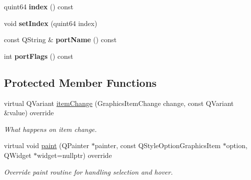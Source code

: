 \begin{Indent}
\begin{DoxyCompactItemize}
quint64 {\bfseries index} () const
\item 
\mbox{\label{classrev_1_1_view_1_1_node_view_port_a674d00e58a7e34e0f0c96810f3c87cbf}} 
void {\bfseries set\+Index} (quint64 index)
\item 
\mbox{\label{classrev_1_1_view_1_1_node_view_port_a384383ce50c4818f1f81d1b0626b55d6}} 
const Q\+String \& {\bfseries port\+Name} () const
\item 
\mbox{\label{classrev_1_1_view_1_1_node_view_port_a3968ec7da920e13cf15bbaa63ad87dab}} 
int {\bfseries port\+Flags} () const
\end{DoxyCompactItemize}
\end{Indent}
\subsection*{Protected Member Functions}
\begin{DoxyCompactItemize}
\item 
\mbox{\label{classrev_1_1_view_1_1_node_view_port_a2294c07c146aff6356b6f4ee5c8f62a6}} 
virtual Q\+Variant \mbox{\hyperlink{classrev_1_1_view_1_1_node_view_port_a2294c07c146aff6356b6f4ee5c8f62a6}{item\+Change}} (Graphics\+Item\+Change change, const Q\+Variant \&value) override
\begin{DoxyCompactList}\small\item\em What happens on item change. \end{DoxyCompactList}\item 
\mbox{\label{classrev_1_1_view_1_1_node_view_port_a632d84fb6b95ca9a53234864c74c5a7a}} 
virtual void \mbox{\hyperlink{classrev_1_1_view_1_1_node_view_port_a632d84fb6b95ca9a53234864c74c5a7a}{paint}} (Q\+Painter $\ast$painter, const Q\+Style\+Option\+Graphics\+Item $\ast$option, Q\+Widget $\ast$widget=nullptr) override
\begin{DoxyCompactList}\small\item\em Override paint routine for handling selection and hover. \end{DoxyCompactList}\end{DoxyCompactItemize}


